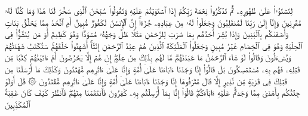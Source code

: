 \stopbuffer
\startbuffer[\q:43:13]
لِتَسۡتَوُۥا۟ عَلَىٰ ظُهُورِهِۦ ثُمَّ تَذۡكُرُوا۟ نِعۡمَةَ رَبِّكُمۡ إِذَا ٱسۡتَوَیۡتُمۡ عَلَیۡهِ وَتَقُولُوا۟ سُبۡحَٰنَ ٱلَّذِی سَخَّرَ لَنَا هَٰذَا وَمَا كُنَّا لَهُۥ مُقۡرِنِینَ%
\stopbuffer
\startbuffer[\q:43:14]
وَإِنَّاۤ إِلَىٰ رَبِّنَا لَمُنقَلِبُونَ%
\stopbuffer
\startbuffer[\q:43:15]
وَجَعَلُوا۟ لَهُۥ مِنۡ عِبَادِهِۦ جُزۡءًاۚ إِنَّ ٱلۡإِنسَٰنَ لَكَفُورࣱ مُّبِینٌ%
\stopbuffer
\startbuffer[\q:43:16]
أَمِ ٱتَّخَذَ مِمَّا یَخۡلُقُ بَنَاتࣲ وَأَصۡفَىٰكُم بِٱلۡبَنِینَ%
\stopbuffer
\startbuffer[\q:43:17]
وَإِذَا بُشِّرَ أَحَدُهُم بِمَا ضَرَبَ لِلرَّحۡمَٰنِ مَثَلࣰا ظَلَّ وَجۡهُهُۥ مُسۡوَدࣰّا وَهُوَ كَظِیمٌ%
\stopbuffer
\startbuffer[\q:43:18]
أَوَ مَن یُنَشَّؤُا۟ فِی ٱلۡحِلۡیَةِ وَهُوَ فِی ٱلۡخِصَامِ غَیۡرُ مُبِینࣲ%
\stopbuffer
\startbuffer[\q:43:19]
وَجَعَلُوا۟ ٱلۡمَلَٰۤئِكَةَ ٱلَّذِینَ هُمۡ عِبَٰدُ ٱلرَّحۡمَٰنِ إِنَٰثًاۚ أَشَهِدُوا۟ خَلۡقَهُمۡۚ سَتُكۡتَبُ شَهَٰدَتُهُمۡ وَیُسۡءَلُونَ%
\stopbuffer
\startbuffer[\q:43:20]
وَقَالُوا۟ لَوۡ شَاۤءَ ٱلرَّحۡمَٰنُ مَا عَبَدۡنَٰهُمۗ مَّا لَهُم بِذَٰلِكَ مِنۡ عِلۡمٍۖ إِنۡ هُمۡ إِلَّا یَخۡرُصُونَ%
\stopbuffer
\startbuffer[\q:43:21]
أَمۡ ءَاتَیۡنَٰهُمۡ كِتَٰبࣰا مِّن قَبۡلِهِۦ فَهُم بِهِۦ مُسۡتَمۡسِكُونَ%
\stopbuffer
\startbuffer[\q:43:22]
بَلۡ قَالُوۤا۟ إِنَّا وَجَدۡنَاۤ ءَابَاۤءَنَا عَلَىٰۤ أُمَّةࣲ وَإِنَّا عَلَىٰۤ ءَاثَٰرِهِم مُّهۡتَدُونَ%
\stopbuffer
\startbuffer[\q:43:23]
وَكَذَٰلِكَ مَاۤ أَرۡسَلۡنَا مِن قَبۡلِكَ فِی قَرۡیَةࣲ مِّن نَّذِیرٍ إِلَّا قَالَ مُتۡرَفُوهَاۤ إِنَّا وَجَدۡنَاۤ ءَابَاۤءَنَا عَلَىٰۤ أُمَّةࣲ وَإِنَّا عَلَىٰۤ ءَاثَٰرِهِم مُّقۡتَدُونَ%
\stopbuffer
\startbuffer[\q:43:24]
۞ قَٰلَ أَوَلَوۡ جِئۡتُكُم بِأَهۡدَىٰ مِمَّا وَجَدتُّمۡ عَلَیۡهِ ءَابَاۤءَكُمۡۖ قَالُوۤا۟ إِنَّا بِمَاۤ أُرۡسِلۡتُم بِهِۦ كَٰفِرُونَ%
\stopbuffer
\startbuffer[\q:43:25]
فَٱنتَقَمۡنَا مِنۡهُمۡۖ فَٱنظُرۡ كَیۡفَ كَانَ عَٰقِبَةُ ٱلۡمُكَذِّبِینَ%
\stopbuffer
